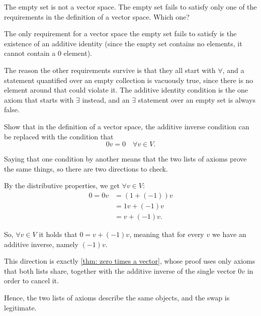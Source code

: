 \begin{xrcs}
  The empty set is not a vector space. The empty set fails to satisfy only one of the requirements in the definition of a vector space. Which one?

  \begin{xsol}
    The only requirement for a vector space the empty set fails to satisfy is the existence of an additive identity (since the empty set contains no elements, it cannot contain a $0$ element).

    The reason the other requirements survive is that they all start with $\forall$, and a statement quantified over an empty collection is vacuously true, since there is no element around that could violate it. The additive identity condition is the one axiom that starts with $\exists$ instead, and an $\exists$ statement over an empty set is always false.
  \end{xsol}
\end{xrcs}

\begin{xrcs}
  Show that in the definition of a vector space, the additive inverse condition can be replaced with the condition that
  \[
    0v = 0 \quad \forall v \in V.
  \]

  \begin{xprf}
    Saying that one condition  by another means that the two lists of axioms prove the same things, so there are two directions to check.

     By the distributive properties, we get $\forall v \in V:$
    \[
    \begin{aligned}
      0 = 0v &= (1 + (-1))v \\
      &= 1v + (-1)v \\
      &= v + (-1)v.
    \end{aligned}
    \]

    So, $\forall v \in V$ it holds that $0 = v + (-1)v$, meaning that for every $v$ we have an additive inverse, namely $(-1)v$.

     This direction is exactly \ref{thm: zero times a vector}, whose proof uses only axioms that both lists share, together with the additive inverse of the single vector $0v$ in order to cancel it.

    Hence, the two lists of axioms describe the same objects, and the swap is legitimate.
  \end{xprf}
\end{xrcs}

